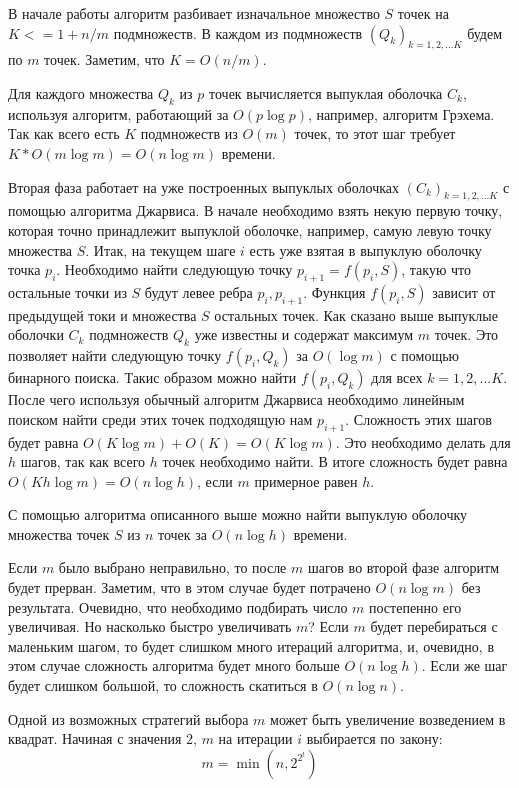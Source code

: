 В начале работы алгоритм разбивает изначальное множество $S$ точек на $K <= 1 + n / m$ подмножеств. В каждом из подмножеств $(Q_k)_{k=1,2,...K}$ будем по $m$ точек. Заметим, что $K = O(n / m)$.

Для каждого множества $Q_k$ из $p$ точек вычисляется выпуклая оболочка $C_k$, используя алгоритм, работающий за $O(p \log p)$, например, алгоритм Грэхема. Так как всего есть $K$ подмножеств из $O(m)$ точек, то этот шаг требует $K * O(m \log m) = O(n \log m)$ времени.

Вторая фаза работает на уже построенных выпуклых оболочках $(C_k)_{k=1,2,...K}$ с помощью алгоритма Джарвиса. В начале необходимо взять некую первую точку, которая точно принадлежит выпуклой оболочке, например, самую левую точку множества $S$. Итак, на текущем шаге $i$ есть уже взятая в выпуклую оболочку точка $p_i$. Необходимо найти следующую точку $p_{i + 1} = f(p_i, S)$, такую что остальные точки из $S$ будут левее ребра $p_i, p_{i+1}$. Функция $f(p_i, S)$ зависит от предыдущей токи и множества $S$ остальных точек. Как сказано выше выпуклые оболочки $C_k$ подмножеств $Q_k$ уже известны и содержат максимум $m$ точек. Это позволяет найти следующую точку $f(p_i, Q_k)$ за $O(\log m)$ с помощью бинарного поиска. Такис образом можно найти $f(p_i, Q_k)$ для всех $k=1,2,...K$. После чего используя обычный алгоритм Джарвиса необходимо линейным поиском найти среди этих точек подходящую нам $p_{i+1}$. Сложность этих шагов будет равна $O(K \log m) + O(K) = O(K \log m)$. Это необходимо делать для $h$ шагов, так как всего $h$ точек необходимо найти. В итоге сложность будет равна $O(K h \log m) = O(n \log h)$, если $m$ примерное равен $h$.

С помощью алгоритма описанного выше можно найти выпуклую оболочку множества точек $S$ из $n$ точек за $O(n \log h)$ времени.

Если $m$ было выбрано неправильно, то после $m$ шагов во второй фазе алгоритм будет прерван. Заметим, что в этом случае будет потрачено $O(n \log m)$ без результата. Очевидно, что необходимо подбирать число $m$ постепенно его увеличивая. Но насколько быстро увеличивать $m$? Если $m$ будет перебираться с маленьким шагом, то будет слишком много итераций алгоритма, и, очевидно, в этом случае сложность алгоритма будет много больше $O(n \log h)$. Если же шаг будет слишком большой, то сложность скатиться в $O(n \log n)$.

Одной из возможных стратегий выбора $m$ может быть увеличение возведением в квадрат. Начиная с значения $2$, $m$ на итерации $i$ выбирается по закону:
\[
m = \min (n,2^{2^t})
\]

